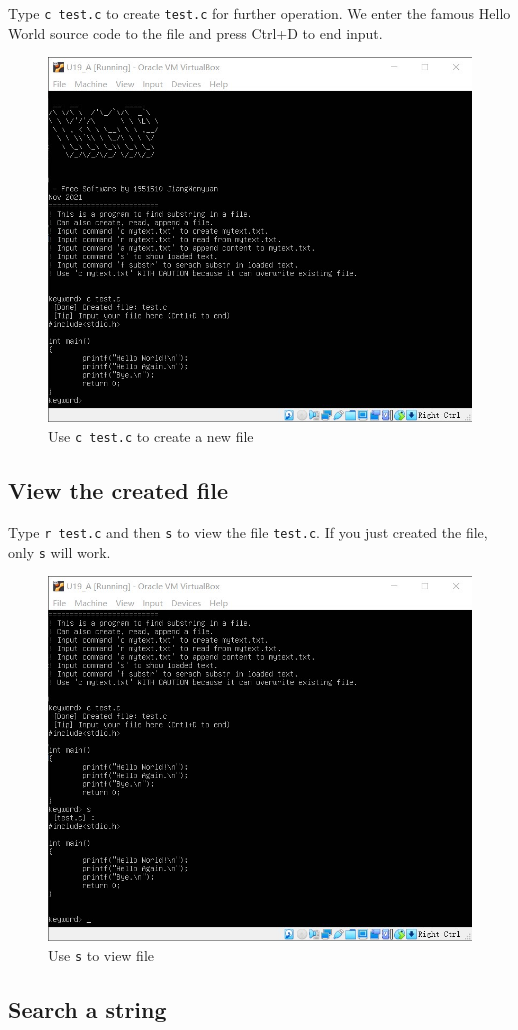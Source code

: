 \documentclass[cn,black,12pt,normal]{elegantnote}
\begin{document}
Type \lstinline{c test.c} to create \lstinline{test.c} for further operation. We enter the famous Hello World source code to the file and press Ctrl+D to end input.

\begin{figure}[H]
    \centering
    \includegraphics[width=0.6\linewidth]{image/kmp_02.jpg}
    \caption{Use \lstinline{c test.c} to create a new file}
\end{figure}

\subsection{View the created file}
Type \lstinline{r test.c} and then \lstinline{s} to view the file \lstinline{test.c}. If you just created the file, only \lstinline{s} will work.

\begin{figure}[H]
    \centering
    \includegraphics[width=0.6\linewidth]{image/kmp_03.jpg}
    \caption{Use \lstinline{s} to view file}
\end{figure}

\subsection{Search a string}
\end{document}

